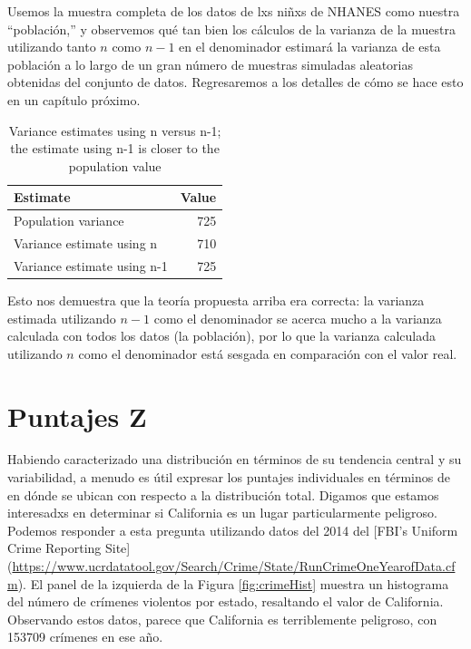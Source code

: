 \documentclass[
  12pt,
]{book}
\begin{document}
Usemos la muestra completa de los datos de lxs niñxs de NHANES como nuestra ``población,'' y observemos qué tan bien los cálculos de la varianza de la muestra utilizando tanto \(n\) como \(n-1\) en el denominador estimará la varianza de esta población a lo largo de un gran número de muestras simuladas aleatorias obtenidas del conjunto de datos. Regresaremos a los detalles de cómo se hace esto en un capítulo próximo.

\begin{table}

\caption{\label{tab:unnamed-chunk-19}Variance estimates using n versus n-1; the estimate using n-1 is closer to the population value}
\centering
\begin{tabular}[t]{l|r}
\hline
Estimate & Value\\
\hline
Population variance & 725\\
\hline
Variance estimate using n & 710\\
\hline
Variance estimate using n-1 & 725\\
\hline
\end{tabular}
\end{table}

Esto nos demuestra que la teoría propuesta arriba era correcta: la varianza estimada utilizando \(n - 1\) como el denominador se acerca mucho a la varianza calculada con todos los datos (la población), por lo que la varianza calculada utilizando \(n\) como el denominador está sesgada en comparación con el valor real.

\hypertarget{puntajes-z}{%
\section{Puntajes Z}\label{puntajes-z}}

Habiendo caracterizado una distribución en términos de su tendencia central y su variabilidad, a menudo es útil expresar los puntajes individuales en términos de en dónde se ubican con respecto a la distribución total. Digamos que estamos interesadxs en determinar si California es un lugar particularmente peligroso. Podemos responder a esta pregunta utilizando datos del 2014 del {[}FBI's Uniform Crime Reporting Site{]} (\url{https://www.ucrdatatool.gov/Search/Crime/State/RunCrimeOneYearofData.cfm}).
El panel de la izquierda de la Figura \ref{fig:crimeHist} muestra un histograma del número de crímenes violentos por estado, resaltando el valor de California. Observando estos datos, parece que California es terriblemente peligroso, con 153709 crímenes en ese año.
\end{document}

